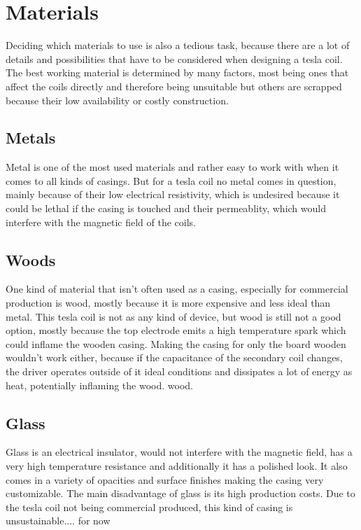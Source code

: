 \section{Materials}

Deciding which materials to use is also a tedious task, because there are a lot of details and possibilities that have to be considered when designing a tesla coil. The best working material is determined by many factors, most being ones that affect the coils directly and therefore being unsuitable but others are scrapped because their low availability or costly construction.

\subsection{Metals}

Metal is one of the most used materials and rather easy to work with when it comes to all kinds of casings. But for a tesla coil no metal comes in question, mainly because of their low electrical resistivity, which is undesired because it could be lethal if the casing is touched and their permeablity, which would interfere with the magnetic field of the coils. 

\subsection{Woods}

One kind of material that isn't often used as a casing, especially for commercial production is wood, mostly because it is more expensive and less ideal than metal. This tesla coil is not as any kind of device, but wood is still not a good option, mostly because the top electrode emits a high temperature spark which could inflame the wooden casing. Making the casing for only the board wooden wouldn't work either, because if the capacitance of the secondary coil changes, the driver operates outside of it ideal conditions and dissipates a lot of energy as heat, potentially inflaming the wood. wood.

\subsection{Glass}

Glass is an electrical insulator, would not interfere with the magnetic field, has a very high temperature resistance and additionally it has a polished look. It also comes in a variety of opacities and surface finishes making the casing very customizable. The main disadvantage of glass is its high production costs. Due to the tesla coil not being commercial produced, this kind of casing is unsustainable.... for now

